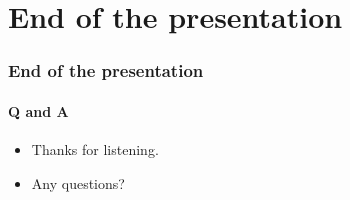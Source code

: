 \documentclass[]{beamer}
\begin{document}
%
%
\section*{End of the presentation}
\begin{frame}
    \frametitle{End of the presentation}
    \framesubtitle{Q and A}
    \begin{center}
        \begin{itemize}
            \item Thanks for listening.
            \item Any questions?
        \end{itemize}
    \end{center}
\end{frame}
\end{document}
